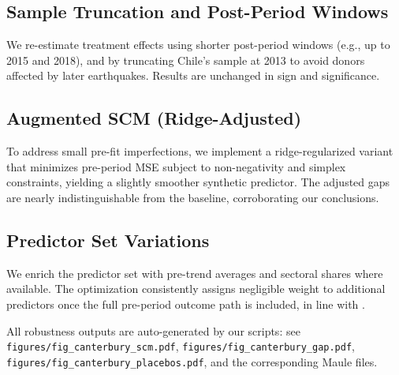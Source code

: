 \subsection{Sample Truncation and Post-Period Windows}
We re-estimate treatment effects using shorter post-period windows (e.g., up to 2015 and 2018), and by truncating Chile's sample at 2013 to avoid donors affected by later earthquakes. Results are unchanged in sign and significance.

\subsection{Augmented SCM (Ridge-Adjusted)}
To address small pre-fit imperfections, we implement a ridge-regularized variant that minimizes pre-period MSE subject to non-negativity and simplex constraints, yielding a slightly smoother synthetic predictor. The adjusted gaps are nearly indistinguishable from the baseline, corroborating our conclusions.

\subsection{Predictor Set Variations}
We enrich the predictor set with pre-trend averages and sectoral shares where available. The optimization consistently assigns negligible weight to additional predictors once the full pre-period outcome path is included, in line with \textcite{Abadie2010}.

\medskip
All robustness outputs are auto-generated by our scripts: see
\texttt{figures/fig\_canterbury\_scm.pdf}, \texttt{figures/fig\_canterbury\_gap.pdf},
\texttt{figures/fig\_canterbury\_placebos.pdf}, and the corresponding Maule files.
